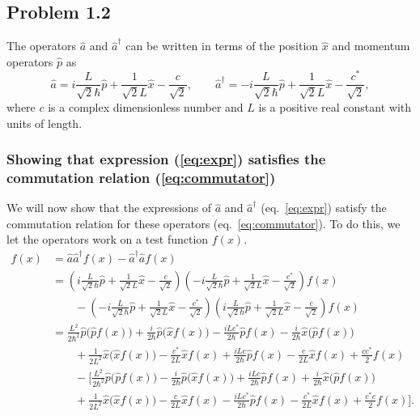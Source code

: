 \documentclass[a4paper, 11pt, titlepage, english]{article}
\newcommand{\op}[1]{\hat{#1}}
\begin{document}
\subsection*{Problem 1.2}
The operators $\op{a}$ and $\op{a}^\dag$ can be written in terms of the position $\op{x}$ and momentum operators $\op{p}$ as
\begin{equation}
\op{a} = i\frac{L}{\sqrt{2}\hbar}\op{p} + \frac{1}{\sqrt{2}L}\op{x} - \frac{c}{\sqrt{2}}, \qquad \op{a}^\dag = -i\frac{L}{\sqrt{2}\hbar}\op{p} + \frac{1}{\sqrt{2}L}\op{x} - \frac{c^*}{\sqrt{2}}, \label{eq:expr}
\end{equation}
where $c$ is a complex dimensionless number and $L$ is a positive real constant with units of length.

\subsubsection*{Showing that expression (\ref{eq:expr}) satisfies the commutation relation (\ref{eq:commutator})}
We will now show that the expressions of $\op{a}$ and $\op{a}^\dag$ (eq.\ \ref{eq:expr}) satisfy the commutation relation for these operators (eq.\ \ref{eq:commutator}). To do this, we let the operators work on a test function $f(x)$.
\begin{align*}
[\op{a}, \op{a}^\dag]f(x) &= \op{a}\op{a}^\dag f(x)- \op{a}^\dag\op{a}f(x) \\
&= \left(i\frac{L}{\sqrt{2}\hbar}\op{p} + \frac{1}{\sqrt{2}L}\op{x} - \frac{c}{\sqrt{2}}\right)\left(-i\frac{L}{\sqrt{2}\hbar}\op{p}  + \frac{1}{\sqrt{2}L}\op{x} - \frac{c^*}{\sqrt{2}}\right)f(x) \\[0.4cm]
& \qquad -\left(-i\frac{L}{\sqrt{2}\hbar}\op{p} + \frac{1}{\sqrt{2}L}\op{x} - \frac{c^*}{\sqrt{2}}\right)\left(i\frac{L}{\sqrt{2}\hbar}\op{p} + \frac{1}{\sqrt{2}L}\op{x} - \frac{c}{\sqrt{2}}\right)f(x) \\[0.4cm]
&= \frac{L^2}{2\hbar^2}\op{p}\bigg(\op{p}f(x)\bigg) + \frac{i}{2\hbar}\op{p}\bigg(\op{x}f(x)\bigg) - \frac{iLc^*}{2\hbar}\op{p}f(x)
- \frac{i}{2\hbar}\op{x}\bigg(\op{p}f(x)\bigg) \\
&\qquad + \frac{1}{2L^2}\op{x}\bigg(\op{x}f(x)\bigg) - \frac{c^*}{2L}\op{x}f(x) + \frac{iLc}{2\hbar}\op{p}f(x) - \frac{c}{2L}\op{x}f(x) + \frac{cc^*}{2}f(x) \\
&\qquad - \Bigg[ \frac{L^2}{2\hbar^2}\op{p}\bigg(\op{p}f(x)\bigg) - \frac{i}{2\hbar}\op{p}\bigg(\op{x}f(x)\bigg) + \frac{iLc}{2\hbar}\op{p}f(x)  + \frac{i}{2\hbar}\op{x}\bigg(\op{p}f(x)\bigg) \\ &\qquad + \frac{1}{2L^2}\op{x}\bigg(\op{x}f(x)\bigg) - \frac{c}{2L}\op{x}f(x) - \frac{iLc^*}{2\hbar}\op{p}f(x) - \frac{c^*}{2L}\op{x}f(x) + \frac{c^*c}{2}f(x) \Bigg].
\end{align*}
\end{document}
